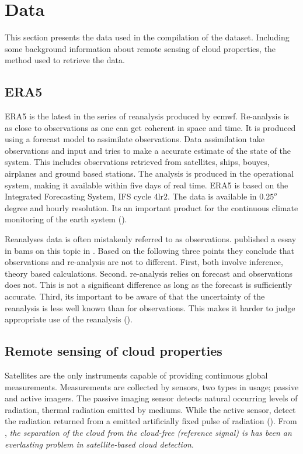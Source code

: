 
\section{Data}
This section presents the data used in the compilation of the dataset. Including some background information about remote sensing of cloud properties, the method used to retrieve the data. 

\subsection{ERA5} \label{sec:era5}
ERA5 is the latest in the series of reanalysis produced by \acrfull{ecmwf}. Re-analysis is as close to observations as one can get coherent in space and time. It is produced using a forecast model to assimilate observations. Data assimilation take observations and input and tries to make a accurate estimate of the state of the system. This includes observations retrieved from satellites, ships, bouyes, airplanes and ground based stations. The analysis is produced in the operational system, making it available within five days of real time. ERA5 is based on the Integrated Forecasting System, IFS cycle 4lr2. The data is available in $0.25^o$ degree and hourly resolution. Its an important product for the continuous climate monitoring of the earth system (\cite{Hersbach2018OperationalStatus}).

Reanalyses data is often mistakenly referred to as observations. \citeauthor{Parker2016ReanalysesDifference} published a essay in \acrfull{bams} on this topic in \citeyear{Parker2016ReanalysesDifference} . Based on the following three points they conclude that observations and re-analysis are not to different. First, both involve inference, theory based calculations. Second. re-analysis relies on forecast and observations does not. This is not a significant difference as long as the forecast is sufficiently accurate. Third, its important to be aware of that the uncertainty of the reanalysis is less well known than for observations. This makes it harder to judge appropriate use of the reanalysis (\cite{Parker2016ReanalysesDifference}). 

\subsection{Remote sensing of cloud properties}
Satellites are the only instruments capable of providing continuous global measurements.
Measurements are collected by sensors, two types in usage; passive and active imagers. The passive imaging sensor detects natural occurring levels of radiation, thermal radiation emitted by mediums. While the active sensor,  detect the radiation returned from a emitted artificially fixed pulse of radiation (\cite{Stephens2018CloudsatSystem}). From \cite{Stockli2019CloudApplications}, \textit{the separation of the cloud from the cloud-free (reference signal) is has been an everlasting problem in satellite-based cloud detection}.


